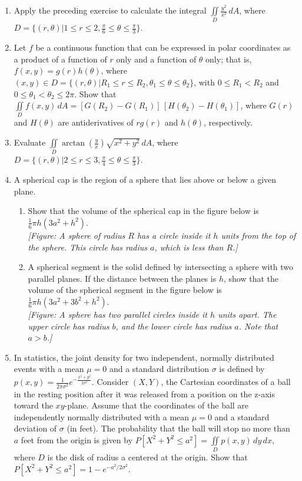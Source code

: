 \documentclass{exercises}
\begin{document}
\begin{enumerate}[resume]
\item Apply the preceding exercise to calculate the integral $\underset{D}{\iint}\frac{y^{2}}{x^{2}}\,dA$, where $D=\{(r,\theta)|1\le r\le2,\frac{\pi}{6}\le \theta \le \frac{\pi}{3}\}$.
\item Let $f$ be a continuous function that can be expressed in polar coordinates as a product of a function of $r$ only and a function of $\theta$ only; that is, $f(x,y)=g(r)h(\theta)$, where $(x,y)\in D=\{(r,\theta)|R_{1}\le r\le R_{2},\theta_{1}\le \theta \le \theta_{2}\}$, with $0\le R_{1}<R_{2}$ and $0\le \theta_{1}<\theta_{2}\le2\pi$. Show that $\underset{D}{\iint}f(x,y)\,dA=[G(R_{2})-G(R_{1})]\,[H(\theta_{2})-H(\theta_{1})]$, where $G(r)$ and $H(\theta)$ are antiderivatives of $rg(r)$ and $h(\theta)$, respectively.
\item Evaluate $\underset{D}{\iint}\arctan(\frac{y}{x})\sqrt{x^{2}+y^{2}}\,dA$, where $D=\{(r,\theta)|2\le r\le3,\frac{\pi}{4}\le \theta \le \frac{\pi}{3}\}$.
\item A spherical cap is the region of a sphere that lies above or below a given plane.
\begin{enumerate}[label=(\alph*)]
  \item Show that the volume of the spherical cap in the figure below is $\frac{1}{6}\pi h(3a^{2}+h^{2})$.\\ \textit{[Figure: A sphere of radius $R$ has a circle inside it $h$ units from the top of the sphere. This circle has radius $a$, which is less than $R$.]}
  \item A spherical segment is the solid defined by intersecting a sphere with two parallel planes. If the distance between the planes is $h$, show that the volume of the spherical segment in the figure below is $\frac{1}{6}\pi h(3a^{2}+3b^{2}+h^{2})$.\\ \textit{[Figure: A sphere has two parallel circles inside it $h$ units apart. The upper circle has radius $b$, and the lower circle has radius $a$. Note that $a>b$.]}
\end{enumerate}
\item In statistics, the joint density for two independent, normally distributed events with a mean $\mu=0$ and a standard distribution $\sigma$ is defined by $p(x,y)=\frac{1}{2\pi \sigma^{2}}e^{-\frac{x^{2}+y^{2}}{2\sigma^{2}}}$. Consider $(X,Y)$, the Cartesian coordinates of a ball in the resting position after it was released from a position on the z-axis toward the $xy$-plane. Assume that the coordinates of the ball are independently normally distributed with a mean $\mu=0$ and a standard deviation of $\sigma$ (in feet). The probability that the ball will stop no more than $a$ feet from the origin is given by $P[X^{2}+Y^{2}\le a^{2}]=\underset{D}{\iint}p(x,y)\,dy\,dx$, where $D$ is the disk of radius a centered at the origin. Show that $P[X^{2}+Y^{2}\le a^{2}]=1-e^{-a^{2}/2\sigma^{2}}$.

\end{enumerate}
\end{document}
